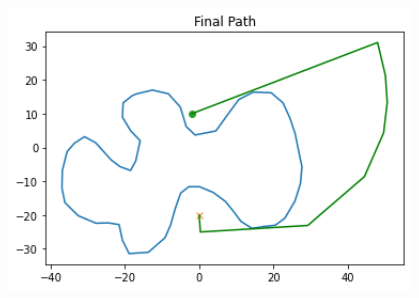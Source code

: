 \documentclass[11pt,landscape]{article}
\begin{document}
\begin{figure}[H]
\begin{mdframed}
\begin{center}
\begin{minipage}{0.3\textwidth}
            \end{minipage}
            \begin{minipage}{0.3\textwidth}
                \includegraphics[width=0.95\textwidth]{final.png}
            \end{minipage}
        \end{center}
    \end{mdframed}
    \label{fig:pathfinding_visual}
\end{figure}
\newpage
\end{document}
